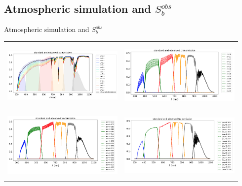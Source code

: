 \documentclass{beamer}
\begin{document}
\subsection{Atmospheric simulation and $S_b^{obs}$}
\begin{frame}{Atmospheric simulation and $S_b^{obs}$}
\begin{tabular}{cc}
\includegraphics[width=5.9cm, height=3.5cm]{figs/atmsimu/atmsimvsairmass.png} & \includegraphics[width=5.9cm, height=3.5cm]{figs/atmsimu/trb_vs_airmass.png} \\
\includegraphics[width=5.9cm, height=3.5cm]{figs/atmsimu/trb_vs_VAOD.png} & \includegraphics[width=5.9cm, height=3.5cm]{figs/atmsimu/trb_vs_PWV.png}
\end{tabular}
\end{frame}
\end{document}
